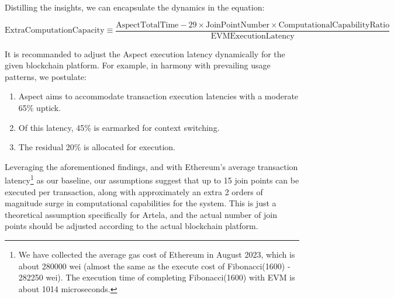 Distilling the insights, we can encapsulate the dynamics in the equation:

\[
  \text{ExtraComputationCapacity} \equiv \frac{\text{AspectTotalTime} - 29 \times \text{JoinPointNumber} \times \text{ComputationalCapabilityRatio}}{\text{EVMExecutionLatency}}
\]

\pagebreak

It is recommanded to adjust the Aspect execution latency dynamically for the given blockchain platform. For example, in harmony with prevailing usage patterns, we postulate:

\begin{enumerate}
  \item Aspect aims to accommodate transaction execution latencies with a moderate 65\% uptick.
  \item Of this latency, 45\% is earmarked for context switching.
  \item The residual 20\% is allocated for execution.
\end{enumerate}

Leveraging the aforementioned findings, and with Ethereum's average transaction latency\footnote{We have collected the average gas cost of Ethereum in August 2023, which is about 280000 wei (almost the same as the execute cost of Fibonacci(1600) - 282250 wei). The execution time of completing Fibonacci(1600) with EVM is about 1014 microseconds.} as our baseline, our assumptions suggest that up to 15 join points can be executed per transaction, along with approximately an extra 2 orders of magnitude surge in computational capabilities for the system. This is just a theoretical assumption specifically for Artela, and the actual number of join points should be adjusted according to the actual blockchain platform.
